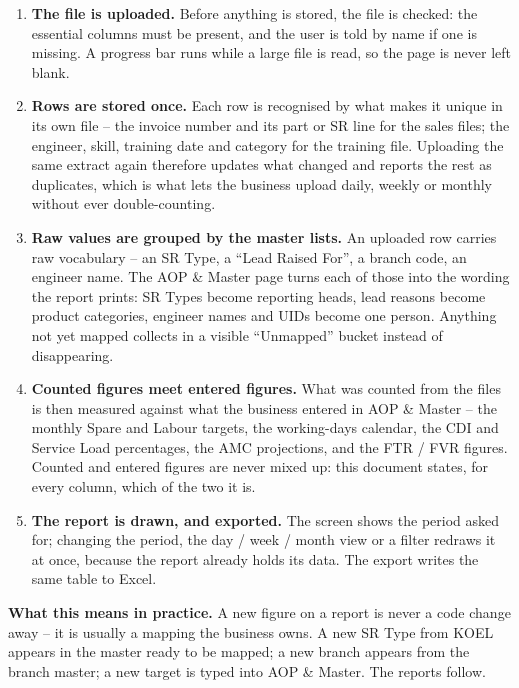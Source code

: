 \documentclass[11pt,a4paper]{article}
\newcommand{\qt}[1]{\textquotedblleft #1\textquotedblright}
\begin{document}
\begin{enumerate}[leftmargin=2.2em,itemsep=5pt]
  \item \textbf{The file is uploaded.} Before anything is stored, the file is checked:
  the essential columns must be present, and the user is told by name if one is missing.
  A progress bar runs while a large file is read, so the page is never left blank.

  \item \textbf{Rows are stored once.} Each row is recognised by what makes it unique in
  its own file -- the invoice number and its part or SR line for the sales files; the
  engineer, skill, training date and category for the training file. Uploading the same
  extract again therefore updates what changed and reports the rest as duplicates,
  which is what lets the business upload daily, weekly or monthly without ever
  double-counting.

  \item \textbf{Raw values are grouped by the master lists.} An uploaded row carries raw
  vocabulary -- an SR Type, a \qt{Lead Raised For}, a branch code, an engineer name.
  The AOP \& Master page turns each of those into the wording the report prints: SR Types
  become reporting heads, lead reasons become product categories, engineer names and UIDs
  become one person. Anything not yet mapped collects in a visible \qt{Unmapped} bucket
  instead of disappearing.

  \item \textbf{Counted figures meet entered figures.} What was counted from the files is
  then measured against what the business entered in AOP \& Master -- the monthly Spare
  and Labour targets, the working-days calendar, the CDI and Service Load percentages,
  the AMC projections, and the FTR / FVR figures. Counted and entered figures are never
  mixed up: this document states, for every column, which of the two it is.

  \item \textbf{The report is drawn, and exported.} The screen shows the period asked
  for; changing the period, the day / week / month view or a filter redraws it at once,
  because the report already holds its data. The export writes the same table to Excel.
\end{enumerate}

\textbf{What this means in practice.} A new figure on a report is never a code change
away -- it is usually a mapping the business owns. A new SR Type from KOEL appears in
the master ready to be mapped; a new branch appears from the branch master; a new target
is typed into AOP \& Master. The reports follow.
\end{document}
